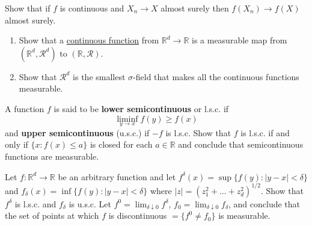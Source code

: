   \begin{exercise}[Durrett 1.3.3]
    Show that if $f$ is continuous and $X_n \to X$ almost surely then $f(X_n) \to f(X)$ almost surely.
  \end{exercise}
  \begin{solution}

  \end{solution}

  \begin{exercise}[Durrett 1.3.4]
    \begin{enumerate}
      \item Show that a \hyperref[pst-def:continuous_func]{continuous function} from $\mathbb{R}^d \to \mathbb{R}$ is a measurable map from $(\mathbb{R}^d, \mathcal{R}^d)$ to $(\mathbb{R}, \mathcal{R})$.
      \item Show that $\mathcal{R}^d$ is the smallest $\sigma$-field that makes all the continuous functions measurable.
    \end{enumerate}
  \end{exercise}
  \begin{solution}

  \end{solution}

  \begin{exercise}[Durrett 1.3.5]
    A function $f$ is said to be \textbf{lower semicontinuous} or l.s.c. if
    \begin{equation*}
      \liminf_{y \to x} f(y) \geq f(x)
    \end{equation*}
    and \textbf{upper semicontinuous} (u.s.c.) if $-f$ is l.s.c. Show that $f$ is l.s.c. if and only if $\{x : f(x) \leq a\}$ is closed for each $a \in \mathbb{R}$ and conclude that semicontinuous functions are measurable.
  \end{exercise}
  \begin{solution}

  \end{solution}

  \begin{exercise}[Durrett 1.3.6]
    Let $f : \mathbb{R}^d \to \mathbb{R}$ be an arbitrary function and let $f^{\delta}(x) = \sup\{f(y) : |y - x| < \delta\}$ and $f_{\delta}(x) = \inf\{f(y) : |y - x| < \delta\}$ where $|z| = (z_1^2 + \dots + z_d^2)^{1/2}$. Show that $f^{\delta}$ is l.s.c. and $f_{\delta}$ is u.s.c. Let $f^0 = \lim_{\delta \downarrow 0} f^{\delta}$, $f_0 = \lim_{\delta \downarrow 0} f_{\delta}$, and conclude that the set of points at which $f$ is discontinuous $= \{f^0 \neq f_0\}$ is measurable.
  \end{exercise}
  \begin{solution}

  \end{solution}

